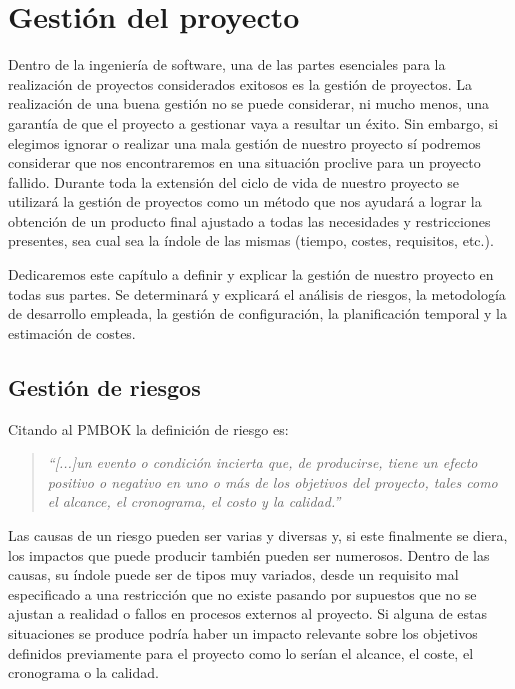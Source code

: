 \chapter{Gestión del proyecto}

Dentro de la ingeniería de software, una de las partes esenciales para la realización de proyectos considerados exitosos es la gestión de proyectos. La realización de una buena gestión no se puede considerar, ni mucho menos, una garantía de que el proyecto a gestionar vaya a resultar un éxito. Sin embargo, si elegimos ignorar o realizar una mala gestión de nuestro proyecto sí podremos considerar que nos encontraremos en una situación proclive para un proyecto fallido. Durante toda la extensión del ciclo de vida de nuestro proyecto se utilizará la gestión de proyectos como un método que nos ayudará a lograr la obtención de un producto final ajustado a todas las necesidades y restricciones presentes, sea cual sea la índole de las mismas (tiempo, costes, requisitos, etc.).

\bigskip

Dedicaremos este capítulo a definir y explicar la gestión de nuestro proyecto en todas sus partes. Se determinará y explicará el análisis de riesgos, la metodología de desarrollo empleada, la gestión de configuración, la planificación temporal y la estimación de costes.

\section{Gestión de riesgos}

Citando al PMBOK \cite{pmbok} la definición de riesgo es:

\begin{quote}
	\textit{
		“[...]un evento o condición incierta que, de producirse, tiene un efecto positivo o
		negativo en uno o más de los objetivos del proyecto, tales como el alcance, el cronograma, el costo y la calidad.”
	}
\end{quote}

Las causas de un riesgo pueden ser varias y diversas y, si este finalmente se diera, los impactos que puede producir también pueden ser numerosos. Dentro de las causas, su índole puede ser de tipos muy variados, desde un requisito mal especificado a una restricción que no existe pasando por supuestos que no se ajustan a realidad o fallos en procesos externos al proyecto. Si alguna de estas situaciones se produce podría haber un impacto relevante sobre los objetivos definidos previamente para el proyecto como lo serían el alcance, el coste, el cronograma o la calidad.

